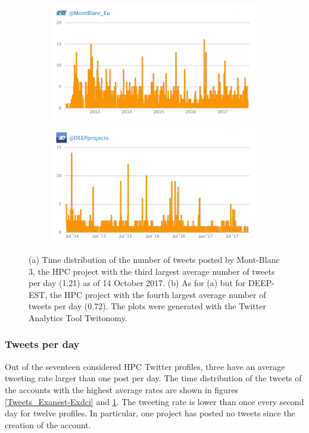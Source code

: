 \begin{figure}
 \centering
 \begin{subfigure}[t]{0.9\textwidth}
   \includegraphics[width=1\linewidth]{Images/Tweets_Montblanc.png}
   \caption{} 
 \end{subfigure}

 \begin{subfigure}[t]{0.9\textwidth}
   \includegraphics[width=1\linewidth]{Images/Tweets_Deepest.png}
   \caption{}
 \end{subfigure}
 \caption{(a) Time distribution of the number of tweets posted by Mont-Blanc 3, the HPC project with the third largest average number of tweets per day (1.21) as of 14 October 2017. (b) As for (a) but for DEEP-EST, the HPC project with the fourth largest average number of tweets per day (0.72). The plots were generated with the Twitter Analytics Tool Twitonomy.} 
 \label{Tweets_Montblanc-Deepest}
\end{figure}

\subsubsection{Tweets per day}
Out of the seventeen considered HPC Twitter profiles, three have an average tweeting rate larger than one post per day. The time distribution of the tweets of the accounts with the highest average rates are shown in figures \ref{Tweets_Exanest-Exdci} and \ref{Tweets_Montblanc-Deepest}. The tweeting rate is lower than once every second day for twelve profiles. In particular, one project has posted no tweets since the creation of the account. 

